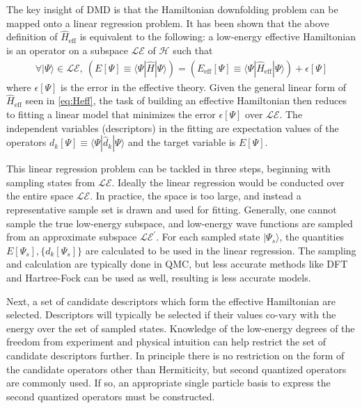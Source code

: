 \documentclass[12pt]{article}
\begin{document}
The key insight of DMD is that the Hamiltonian downfolding problem can be mapped onto a linear regression problem.
It has been shown that the above definition of $\hat{H}_\text{eff}$ is equivalent to the following: a low-energy effective Hamiltonian is an operator on a subspace $\mathcal{LE}$ of $\mathcal{H}$ such that 
\begin{equation}
\begin{split}
\forall |\Psi\rangle \in \mathcal{LE},\ (E[\Psi] \equiv \langle \Psi|\hat{H} | \Psi \rangle)  = (E_\text{eff}[\Psi] \equiv \langle \Psi | \hat{H}_\text{eff} | \Psi \rangle) + \epsilon[\Psi]
\end{split}
\label{eq:DMD}
\end{equation}
where $\epsilon[\Psi]$ is the error in the effective theory.
Given the general linear form of $\hat{H}_\text{eff}$ seen in \eqref{eq:Heff}, 
the task of building an effective Hamiltonian then reduces to fitting a linear model that minimizes the error $\epsilon[\Psi]$ over $\mathcal{LE}$.
The independent variables (descriptors) in the fitting are expectation values of the operators $d_k[\Psi] \equiv \langle \Psi |\hat{d}_k|\Psi \rangle$ and the target variable is $E[\Psi]$.

This linear regression problem can be tackled in three steps, beginning with sampling states from $\mathcal{LE}$.
Ideally the linear regression would be conducted over the entire space $\mathcal{LE}$. 
In practice, the space is too large, and instead a representative sample set is drawn and used for fitting.
Generally, one cannot sample the true low-energy subspace, and low-energy wave functions are sampled from an approximate subspace $\mathcal{LE}^\prime$.
For each sampled state $|\Psi_s\rangle$, the quantities $E[\Psi_s], \{d_k[\Psi_s]\}$ are calculated to be used in the linear regression.
The sampling and calculation are typically done in QMC, but less accurate methods like DFT and Hartree-Fock can be used as well, resulting is less accurate models.

Next, a set of candidate descriptors which form the effective Hamiltonian are selected.
Descriptors will typically be selected if their values co-vary with the energy over the set of sampled states. 
Knowledge of the low-energy degrees of the freedom from experiment and physical intuition can help restrict the set of candidate descriptors further.
In principle there is no restriction on the form of the candidate operators other than Hermiticity, but second quantized operators are commonly used.
If so, an appropriate single particle basis to express the second quantized operators must be constructed.
\end{document}
